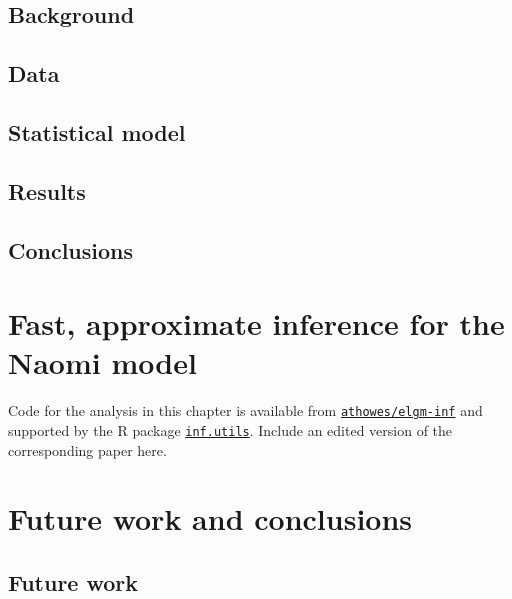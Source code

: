 \documentclass[a4paper, nobind]{templates/ociamthesis}
\begin{document}
\hypertarget{background-1}{%
\section{Background}\label{background-1}}

\hypertarget{data}{%
\section{Data}\label{data}}

\hypertarget{statistical-model}{%
\section{Statistical model}\label{statistical-model}}

\hypertarget{results}{%
\section{Results}\label{results}}

\hypertarget{conclusions}{%
\section{Conclusions}\label{conclusions}}

\hypertarget{elgm-inf}{%
\chapter{Fast, approximate inference for the Naomi model}\label{elgm-inf}}

\adjustmtc
{}

Code for the analysis in this chapter is available from \href{https://github.com/athowes/elgm-inf}{\texttt{athowes/elgm-inf}} and supported by the R package \href{https://athowes.github.io/inf.utils}{\texttt{inf.utils}}.
Include an edited version of the corresponding paper here.

\hypertarget{future-work-and-conclusions}{%
\chapter{Future work and conclusions}\label{future-work-and-conclusions}}

\adjustmtc
{}

\hypertarget{future-work}{%
\section{Future work}\label{future-work}}
\end{document}
